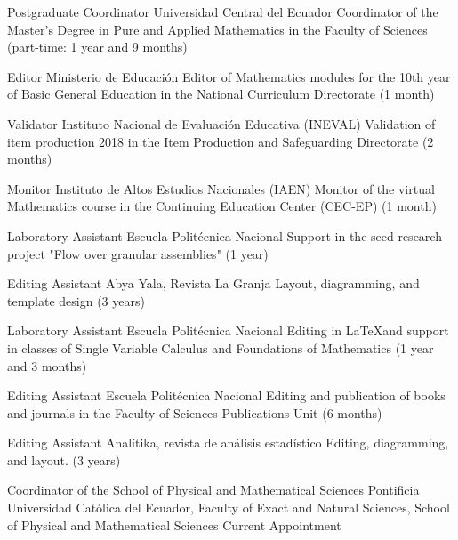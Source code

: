 \documentclass[
    a4paper,
    maincolor=cvblue!70!blue,
    sidecolor=gray!30,
    sectioncolor=cvblue!70!blue,
    sidebarwidth=7.5cm,
    topbottommargin=20pt,
    leftrightmargin=20pt,
]{fortysecondscv}
\begin{document}

    {Postgraduate Coordinator}
    {Universidad Central del Ecuador}
    {Coordinator of the Master's Degree in Pure and Applied Mathematics in the Faculty of Sciences (part-time: 1 year and 9 months)}

    {Editor}
    {Ministerio de Educación}
    {Editor of Mathematics modules for the 10th year of Basic General Education in the National Curriculum Directorate (1 month)}

    {Validator}
    {Instituto Nacional de Evaluación Educativa (INEVAL)}
    {Validation of item production 2018 in the Item Production and Safeguarding Directorate (2 months)}

    {Monitor}
    {Instituto de Altos Estudios Nacionales (IAEN)}
    {Monitor of the virtual Mathematics course in the Continuing Education Center (CEC-EP) (1 month)}

    {Laboratory Assistant}
    {Escuela Politécnica Nacional}
    {Support in the seed research project "Flow over granular assemblies" (1 year)}

    {Editing Assistant}
    {Abya Yala, Revista La Granja}
    {Layout, diagramming, and template design (3 years)}

    {Laboratory Assistant}
    {Escuela Politécnica Nacional}
    {Editing in \LaTeX and support in classes of Single Variable Calculus and Foundations of Mathematics (1 year and 3 months)}

    {Editing Assistant}
    {Escuela Politécnica Nacional}
    {Editing and publication of books and journals in the Faculty of Sciences Publications Unit (6 months)}

    {Editing Assistant}
    {Analítika, revista de análisis estadístico}
    {Editing, diagramming, and layout. (3 years)}


\makebacksidebar


    {Coordinator of the School of Physical and Mathematical Sciences}
    {Pontificia Universidad Católica del Ecuador, Faculty of Exact and Natural Sciences, School of Physical and Mathematical Sciences}
    {Current Appointment}
    
\end{document}
